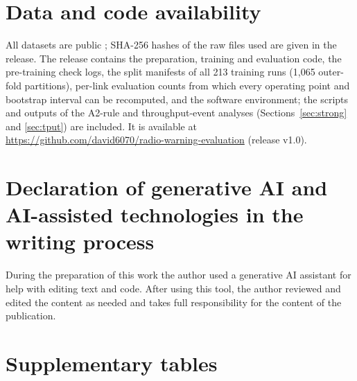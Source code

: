 \documentclass[preprint,review,12pt]{elsarticle}
\begin{document}
\section*{Data and code availability}
All datasets are public \cite{silva2024,raca2018,raca2020}; SHA-256 hashes of the
raw files used are given in the release. The release contains the preparation,
training and evaluation code, the pre-training check logs, the split manifests of all
213 training runs (1{,}065 outer-fold partitions), per-link evaluation counts from
which every operating point and bootstrap interval can be recomputed, and the software
environment; the scripts and outputs of the A2-rule and throughput-event analyses
(Sections~\ref{sec:strong} and \ref{sec:tput}) are included. It is available at
\url{https://github.com/david6070/radio-warning-evaluation} (release v1.0).

\section*{Declaration of generative AI and AI-assisted technologies in the writing process}
During the preparation of this work the author used a generative AI assistant for
help with editing text and code. After using this tool, the author reviewed and
edited the content as needed and takes full responsibility for the content of the
publication.


\appendix
\section{Supplementary tables}
\label{app:tables}
\end{document}
